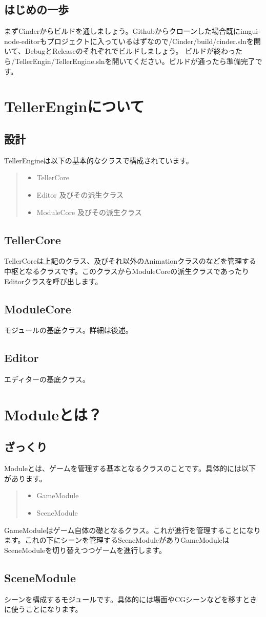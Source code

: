 \documentclass[12pt,a4j,uplatex]{jsarticle}
\begin{document}
\subsection{はじめの一歩}
まずCinderからビルドを通しましょう。Githubからクローンした場合既にimgui-node-editorもプロジェクトに入っているはずなので/Cinder/build/cinder.slnを開いて、DebugとReleaseのそれぞれでビルドしましょう。
ビルドが終わったら/TellerEngin/TellerEngine.slnを開いてください。ビルドが通ったら準備完了です。
\section{TellerEnginについて}
\subsection{設計}
TellerEngineは以下の基本的なクラスで構成されています。
\begin{quote}
  \begin{itemize}
    \item TellerCore
    \item Editor 及びその派生クラス
    \item ModuleCore 及びその派生クラス
  \end{itemize}
\end{quote}
\subsection{TellerCore}
TellerCoreは上記のクラス、及びそれ以外のAnimationクラスのなどを管理する中枢となるクラスです。このクラスからModuleCoreの派生クラスであったりEditorクラスを呼び出します。
\subsection{ModuleCore}
モジュールの基底クラス。詳細は後述。
\subsection{Editor}
エディターの基底クラス。
\section{Moduleとは？}
\subsection{ざっくり}
Moduleとは、ゲームを管理する基本となるクラスのことです。具体的には以下があります。
\begin{quote}
  \begin{itemize}
    \item GameModule
    \item SceneModule
  \end{itemize}
\end{quote}
GameModuleはゲーム自体の礎となるクラス。これが進行を管理することになります。これの下にシーンを管理するSceneModuleがありGameModuleはSceneModuleを切り替えつつゲームを進行します。
\subsection{SceneModule}
シーンを構成するモジュールです。具体的には場面やCGシーンなどを移すときに使うことになります。
\end{document}
